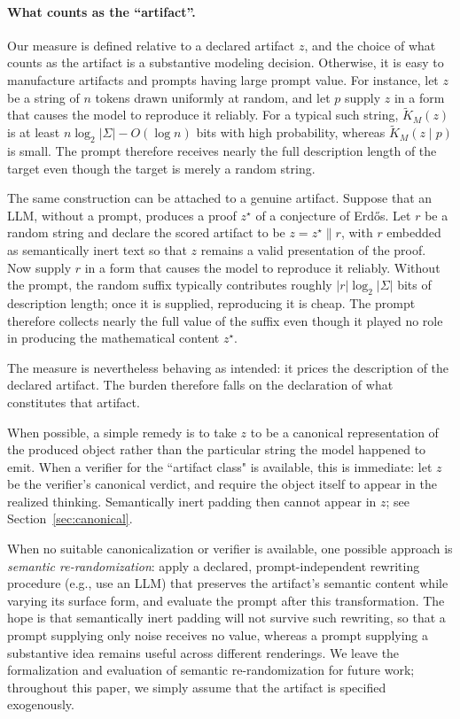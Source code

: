 \documentclass[letterpaper]{article} %
\theoremstyle{definition}
\theoremstyle{remark}
\begin{document}
\paragraph{What counts as the ``artifact''.}
Our measure is defined relative to a declared artifact \(z\), and the choice of
what counts as the artifact is a substantive modeling decision. Otherwise, it
is easy to manufacture artifacts and prompts having large prompt value. For
instance, let \(z\) be a string of \(n\) tokens drawn uniformly at random, and
let \(p\) supply \(z\) in a form that causes the model to reproduce it reliably.
For a typical such string,
\(\widetilde K_M(z)\) is at least
\(n\log_2|\Sigma|-O(\log n)\) bits with high probability, whereas
\(\widetilde K_M(z\mid p)\) is small. The prompt therefore receives nearly the
full description length of the target even though the target is merely a random string.

The same construction can be attached to a genuine artifact. Suppose that an
LLM, without a prompt, produces a proof \(z^\star\) of a conjecture of
Erd\H{o}s. Let \(r\) be a random string and declare the scored artifact to be
\(z=z^\star\mathbin{\|}r\), with \(r\) embedded as semantically inert text so
that \(z\) remains a valid presentation of the proof. Now supply \(r\) in a
form that causes the model to reproduce it reliably. Without the prompt, the
random suffix typically contributes roughly
\(|r|\log_2|\Sigma|\) bits of description length; once it is supplied,
reproducing it is cheap. The prompt therefore collects nearly the full value of
the suffix even though it played no role in producing the mathematical content
\(z^\star\).

The measure is nevertheless behaving as intended: it prices the description of
the declared artifact. The burden therefore falls on the declaration of what
constitutes that artifact.

When possible, a simple remedy is to take \(z\) to be a canonical
representation of the produced object rather than the particular string the
model happened to emit. When a verifier for the ``artifact class" is available, this is immediate: let
\(z\) be the verifier's canonical verdict, and require the object itself to appear in the realized thinking. Semantically inert padding then cannot appear in \(z\);
see Section~\ref{sec:canonical}.

When no suitable canonicalization or verifier is available, one possible
approach is \emph{semantic re-randomization}: apply a declared,
prompt-independent rewriting procedure (e.g., use an LLM) that preserves the artifact's semantic
content while varying its surface form, and evaluate the prompt after this
transformation. The hope is that semantically inert padding will not survive
such rewriting, so that a prompt supplying only noise receives no value,
whereas a prompt supplying a substantive idea remains useful across different
renderings. We leave the formalization and evaluation of semantic
re-randomization for future work; throughout this paper, we simply assume that
the artifact is specified exogenously.
\end{document}

